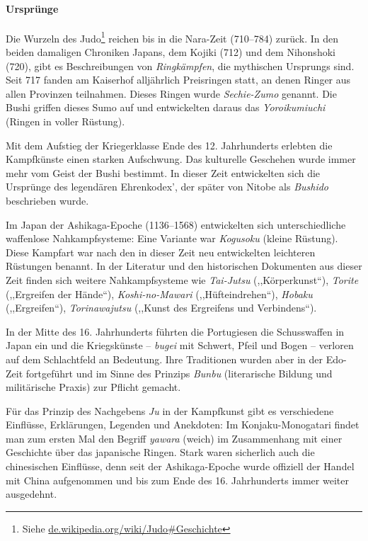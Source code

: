 \documentclass[justified, a4paper, notitlepage, captions=tableheading, nobib]{tufte-handout}
\begin{document}
\paragraph{Ursprünge}
\label{sec:org5fb6d00}
Die Wurzeln des \label{org60aba15}Judo\footnote{Siehe \href{https://de.wikipedia.org/wiki/Judo\#Geschichte}{de.wikipedia.org/wiki/Judo\#Geschichte}} reichen bis in die Nara-Zeit (710–784) zurück. In den beiden damaligen Chroniken Japans, dem Kojiki (712) und dem Nihonshoki (720), gibt es Beschreibungen von \emph{Ringkämpfen}, die mythischen Ursprungs sind. Seit 717 fanden am Kaiserhof alljährlich Preisringen statt, an denen Ringer aus allen Provinzen teilnahmen. Dieses Ringen wurde \emph{Sechie-Zumo} genannt. Die Bushi griffen dieses Sumo auf und entwickelten daraus das \emph{Yoroikumiuchi} (Ringen in voller Rüstung).

Mit dem Aufstieg der Kriegerklasse Ende des 12. Jahrhunderts erlebten die Kampfkünste einen starken Aufschwung. Das kulturelle Geschehen wurde immer mehr vom Geist der Bushi bestimmt. In dieser Zeit entwickelten sich die Ursprünge des legendären Ehrenkodex', der später von Nitobe als \emph{Bushido} beschrieben wurde.

Im Japan der Ashikaga-Epoche (1136–1568) entwickelten sich unterschiedliche waffenlose Nahkampfsysteme: Eine Variante war \emph{Kogusoku} (kleine Rüstung). Diese Kampfart war nach den in dieser Zeit neu entwickelten leichteren Rüstungen benannt. In der Literatur und den historischen Dokumenten aus dieser Zeit finden sich weitere Nahkampfsysteme wie \emph{Tai-Jutsu} (,,Körperkunst``), \emph{Torite} (,,Ergreifen der Hände``), \emph{Koshi-no-Mawari} (,,Hüfteindrehen``), \emph{Hobaku} (,,Ergreifen``), \emph{Torinawajutsu} (,,Kunst des Ergreifens und Verbindens``).

In der Mitte des 16. Jahrhunderts führten die Portugiesen die Schusswaffen in Japan ein und die Kriegskünste – \emph{bugei} mit Schwert, Pfeil und Bogen – verloren auf dem Schlachtfeld an Bedeutung. Ihre Traditionen wurden aber in der Edo-Zeit fortgeführt und im Sinne des Prinzips \emph{Bunbu} (literarische Bildung und militärische Praxis) zur Pflicht gemacht.

Für das Prinzip des Nachgebens \emph{Ju} in der Kampfkunst gibt es verschiedene Einflüsse, Erklärungen, Legenden und Anekdoten: Im Konjaku-Monogatari findet man zum ersten Mal den Begriff \emph{yawara} (weich) im Zusammenhang mit einer Geschichte über das japanische Ringen. Stark waren sicherlich auch die chinesischen Einflüsse, denn seit der Ashikaga-Epoche wurde offiziell der Handel mit China aufgenommen und bis zum Ende des 16. Jahrhunderts immer weiter ausgedehnt.
\end{document}
